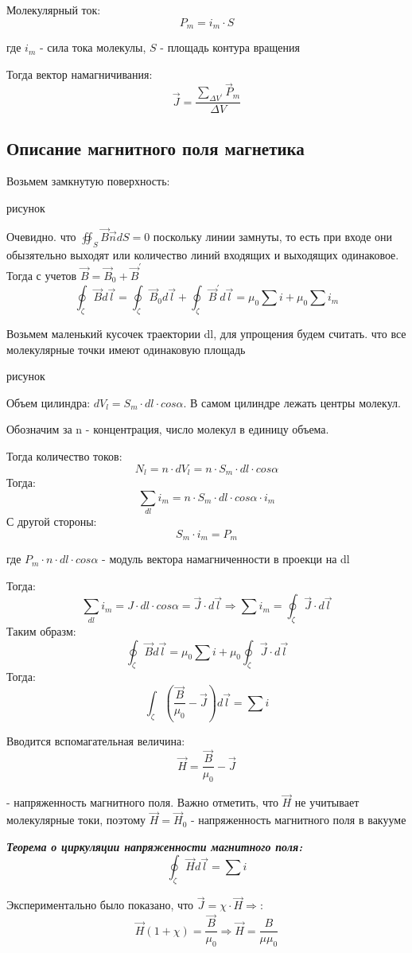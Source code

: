\documentclass[../main.tex]{subfiles}
\begin{document}
Молекулярный ток: 
\[P_m = i_m \cdot S\]
\begin{center}
    где $i_m$ - сила тока молекулы, $S$ - площадь контура вращения
\end{center}
Тогда вектор намагничивания: 
\[\vec J = \frac{\sum_{\Delta V^{\prime}} \vec P_m}{\Delta V}\]

\subsection{Описание магнитного поля магнетика}
Возьмем замкнутую поверхность:

рисунок 

Очевидно. что $\oiint_{S} \vec B \vec n dS = 0$ поскольку линии замнуты, то есть при входе они обызятельно выходят или количество линий входящих и выходящих одинаковое.
Тогда с учетов $\vec B = \vec B_0 + \vec B^{\prime}$
\[\oint_{\zeta} \vec B d \vec l = \oint_{\zeta} \vec B_0 d \vec l  + \oint_{\zeta} \vec B^{\prime} d \vec l = \mu_0 \sum i + \mu_0 \sum i_m \]

Возьмем маленький кусочек траектории dl, для упрощения будем считать. что все молекулярные точки имеют одинаковую площадь

рисунок 

Объем цилиндра: $dV_l = S_m \cdot dl \cdot cos{\alpha}$. В самом цилиндре лежать центры молекул.

Обозначим за n - концентрация, число молекул в единицу объема.

Тогда количество токов: 
\[N_l = n \cdot dV_l = n \cdot S_m \cdot dl \cdot cos{\alpha}\]
Тогда:
\[\sum_{dl}i_m = n \cdot S_m \cdot dl \cdot cos{\alpha} \cdot i_m\]
С другой стороны:
\[S_m \cdot i_m = P_m\]
\begin{center}
    где $P_m \cdot n \cdot dl \cdot cos{\alpha}$ - модуль вектора намагниченности в проекци на dl
\end{center}
Тогда:
\[\sum_{dl} i_m = J \cdot dl \cdot cos{\alpha} = \vec J \cdot d \vec l \Rightarrow \sum i_m = \oint_{\zeta} \vec J \cdot d \vec l\]
Таким образм:
\[\oint_{\zeta} \vec B d \vec l = \mu_0 \sum i + \mu_0 \oint_{\zeta} \vec J \cdot d \vec l\]
Тогда:
\[\int_{\zeta}(\frac{\vec B}{\mu_0} - \vec J) d \vec l = \sum i\]

Вводится вспомагательная величина:
\[\vec H = \frac{\vec B}{\mu_0} - \vec J\]
\begin{center}
    - напряженность магнитного поля. Важно отметить, что $\vec H$ не учитывает молекулярные токи, поэтому $\vec H = \vec H_0$ - напряженность магнитного поля в вакууме
\end{center}

\textit{\textbf{Теорема о циркуляции напряженности магнитного поля:}}
\[\oint_{\zeta} \vec H d \vec l = \sum i\]

Экспериментально было показано, что $\vec J = \chi \cdot \vec H \Rightarrow$:
\[\vec H(1+ \chi) = \frac{\vec B}{\mu_0} \Rightarrow \vec H = \frac{B}{\mu \mu_0}\]
\end{document}
